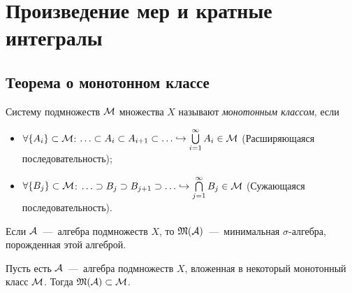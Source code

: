 \section{Произведение мер и кратные интегралы}
\subsection{Теорема о монотонном классе}
\begin{definition}
    Систему подмножеств $\mathcal{M}$ множества $X$ называют \textit{монотонным классом}, если 
    \begin{itemize}
        \item $\forall \{A_i\} \subset \mathcal{M}$: $\ldots \subset A_i \subset A_{i + 1} \subset \ldots \hookrightarrow \bigcup\limits_{i = 1}^\infty A_i \in \mathcal{M}$ (Расширяющаяся последовательность);
        \item $\forall \{B_j\} \subset \mathcal{M}$: $\ldots \supset B_j \supset B_{j + 1} \supset \ldots \hookrightarrow \bigcap\limits_{j = 1}^\infty B_j \in \mathcal{M}$ (Сужающаяся последовательность).
    \end{itemize}
\end{definition}
\begin{reminder}
    Если $\mathcal{A}$~---~алгебра подмножеств $X$, то $\mathfrak{M}(\mathcal{A})$~---~минимальная $\sigma$-алгебра, порожденная этой алгеброй.
\end{reminder}
\begin{theorem}
    Пусть есть $\mathcal{A}$~---~алгебра подмножеств $X$, вложенная в некоторый монотонный класс $\mathcal{M}$. Тогда $\mathfrak{M}(\mathcal{A}) \subset \mathcal{M}$.
\end{theorem}
